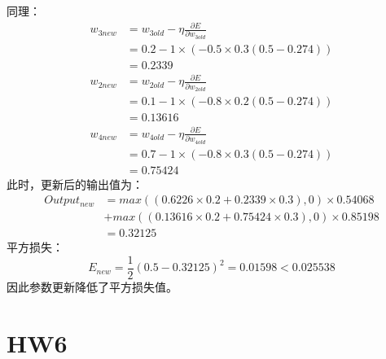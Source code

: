 \documentclass[UTF8,a4paper,AutoFakeBold,AutoFakeSlant]{article}
\begin{document}
同理：
\begin{equation*}
  \begin{aligned}
    w_{3new} & = w_{3old} - \eta\frac{\partial E}{\partial w_{3old}} \\
             & = 0.2 - 1\times (-0.5\times 0.3(0.5 - 0.274))         \\
             & = 0.2339
  \end{aligned}
\end{equation*}
\begin{equation*}
  \begin{aligned}
    w_{2new} & = w_{2old} - \eta\frac{\partial E}{\partial w_{2old}} \\
             & = 0.1 - 1\times (-0.8\times 0.2(0.5 - 0.274))         \\
             & = 0.13616
  \end{aligned}
\end{equation*}
\begin{equation*}
  \begin{aligned}
    w_{4new} & = w_{4old} - \eta\frac{\partial E}{\partial w_{4old}} \\
             & = 0.7 - 1\times (-0.8\times 0.3(0.5 - 0.274))         \\
             & = 0.75424
  \end{aligned}
\end{equation*}
此时，更新后的输出值为：
\begin{equation*}
  \begin{aligned}
    Output_{new} & = max((0.6226\times 0.2 + 0.2339\times 0.3),0)\times 0.54068 \\&+ max((0.13616\times 0.2 + 0.75424\times 0.3),0)\times 0.85198\\
                 & = 0.32125
  \end{aligned}
\end{equation*}
平方损失：
\begin{equation*}
  E_{new} = \frac{1}{2} (0.5-0.32125)^2 = 0.01598 < 0.025538
\end{equation*}
因此参数更新降低了平方损失值。






\section{HW6}
\end{document}

